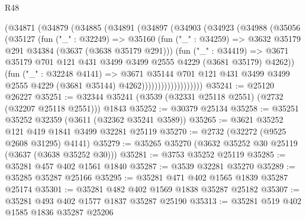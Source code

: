 \begin{lexlean}{R48}
\begin{coremodule}
                    (@34871
                      (@34879
                        (@34885
                          (@34891
                            (@34897
                              (@34903
                                (@34923
                                  (@34988
                                    (@35056
                                      (@35127
                                        (fun ("_" : @32249) =>
                                        @35160
                                          (fun ("_" : @34259) =>
                                          @3632 @35179 @291 @34384 (@3637 (@3638 @35179 @291)))
                                          (fun ("_" : @34419) =>
                                          @3671
                                            @35179
                                            @701
                                            @121
                                            @431
                                            @3499
                                            @3499
                                            @2555
                                            @4229
                                            (@3681 @35179)
                                            @4262))
                                        (fun ("_" : @32248 @4141) =>
                                        @3671
                                          @35144
                                          @701
                                          @121
                                          @431
                                          @3499
                                          @3499
                                          @2555
                                          @4229
                                          (@3681 @35144)
                                          @4262)))))))))))))))))))
@35241 := @25120 @26227
@35251 := @32344 @35241 (@3539 (@32331 @25118 @2551) (@2732 (@32207 @25118 @2551))) @1843
@35252 := @30379 @25134
@35258 := @35251 @35252 @32359 (@3611 (@32362 @35241 @3589))
@35265 := @3621 @35252 @121 @419 @1841 @3499 @32281 @25119
@35270 := @2732 (@32272 (@9525 @2608 @31295) @4141)
@35279 := @35265 @35270 (@3632 @35252 @30 @25119 (@3637 (@3638 @35252 @30)))
@35281 := @3753 @35252 @25119
@35285 := @35281 @457 @402 @1561 @1840
@35287 := @3539 @32281 @35270
@35289 := @35285 @35287 @25166
@35295 := @35281 @471 @402 @1565 @1839 @35287 @25174
@35301 := @35281 @482 @402 @1569 @1838 @35287 @25182
@35307 := @35281 @493 @402 @1577 @1837 @35287 @25190
@35313 := @35281 @519 @402 @1585 @1836 @35287 @25206

\end{coremodule}
\end{lexlean}
